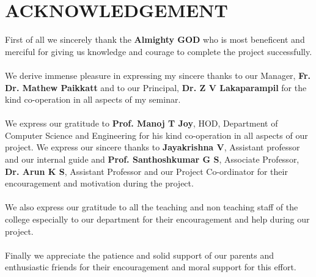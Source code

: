 \chapter*{ACKNOWLEDGEMENT}
\begin{spacing}{1.5}
First of all we sincerely thank the \textbf{Almighty GOD} who is most beneficent and merciful for giving us knowledge and courage to complete the project successfully.\\\\
We derive immense pleasure in expressing my sincere thanks to our Manager,\textbf{ Fr. Dr. Mathew Paikkatt} and to our Principal, \textbf{Dr. Z V Lakaparampil} for the kind co-operation in all aspects of my seminar.\\\\
We express our gratitude to \textbf{Prof. Manoj T Joy}, HOD, Department of Computer Science and Engineering for his kind co-operation in all aspects of our project. We express our sincere thanks to\textbf{ Jayakrishna V}, Assistant professor and our internal guide and \textbf{Prof. Santhoshkumar G S}, Associate Professor, \textbf{Dr. Arun K S}, Assistant Professor and our Project Co-ordinator for their encouragement and motivation during the project.\\\\
We also express our gratitude to all the teaching and non teaching staff of the college especially to our department for their encouragement and help during our project.\\\\
Finally we appreciate the patience and solid support of our parents and enthusiastic friends for their encouragement and moral support for this effort.

\end{spacing}


